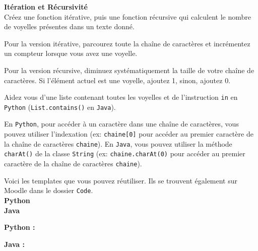\begin{Exercice}[15 minutes]\textbf{Itération et Récursivité} \\
Créez une fonction itérative, puis une fonction récursive qui calculent le nombre de voyelles présentes dans un texte donné. \\

\begin{conseil}
   Pour la version itérative, parcourez toute la chaîne de caractères et incrémentez un compteur lorsque vous avez une voyelle.
   
   Pour la version récursive, diminuez systématiquement la taille de votre chaîne de caractères. Si l'élément actuel est une voyelle, ajoutez 1, sinon, ajoutez 0.
   
   Aidez vous d'une liste contenant toutes les voyelles et de l'instruction \lstinline{in} en \lstinline{Python} (\lstinline{List.contains()} en \lstinline{Java}).

   En \lstinline{Python}, pour accéder à un caractère dans une chaîne de caractères, vous pouvez utiliser l'indexation (ex: \lstinline{chaine[0]} pour accéder au premier caractère de la chaîne de caractères \lstinline{chaine}). En \lstinline{Java}, vous pouvez utiliser la méthode \lstinline{charAt()} de la classe \lstinline{String} (ex: \lstinline{chaine.charAt(0)} pour accéder au premier caractère de la chaîne de caractères \lstinline{chaine}).
\end{conseil}

Voici les templates que vous pouvez réutiliser. Ils se trouvent également sur Moodle dans le dossier \lstinline{Code}. \\

\textbf{Python} \\
     

\textbf{Java} \\
    

    
\begin{solution}
\textbf{Python :} \\
    
    
\end{solution}


\begin{solution}   
\textbf{Java :} \\

    
    
    
    
\end{solution}

\end{Exercice}

